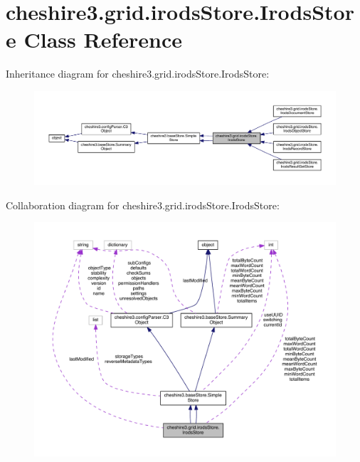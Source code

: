 \hypertarget{classcheshire3_1_1grid_1_1irods_store_1_1_irods_store}{\section{cheshire3.\-grid.\-irods\-Store.\-Irods\-Store Class Reference}
\label{classcheshire3_1_1grid_1_1irods_store_1_1_irods_store}
}


Inheritance diagram for cheshire3.\-grid.\-irods\-Store.\-Irods\-Store\-:
\nopagebreak
\begin{figure}[H]
\begin{center}
\leavevmode
\includegraphics[width=350pt]{classcheshire3_1_1grid_1_1irods_store_1_1_irods_store__inherit__graph}
\end{center}
\end{figure}


Collaboration diagram for cheshire3.\-grid.\-irods\-Store.\-Irods\-Store\-:
\nopagebreak
\begin{figure}[H]
\begin{center}
\leavevmode
\includegraphics[width=350pt]{classcheshire3_1_1grid_1_1irods_store_1_1_irods_store__coll__graph}
\end{center}
\end{figure}
